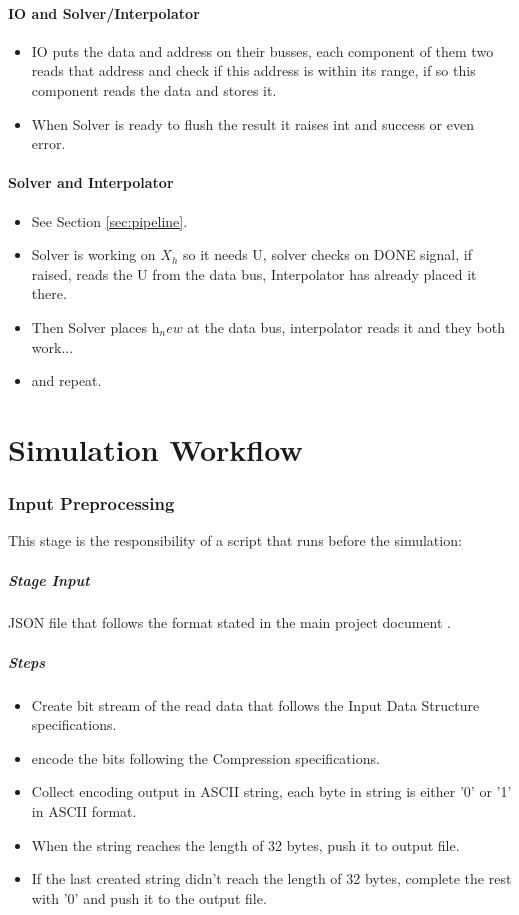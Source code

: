 \documentclass[12pt]{report}
\begin{document}
\subsection{IO and Solver/Interpolator}
\begin{itemize}
    \item IO puts the data and address on their busses, each component of them two reads that address and check if this address is within its range, if so this component reads the data and stores it.
    \item When Solver is ready to flush the result it raises int and success or even error.
\end{itemize}

\subsection{Solver and Interpolator}
\begin{itemize}
    \item See Section \ref{sec:pipeline}.
    \item Solver is working on $X_h$ so it needs U, solver checks on DONE signal, if raised, reads the U from the data bus, Interpolator has already placed it there.
    \item Then Solver places h$_new$ at the data bus, interpolator reads it and they both work...
    \item and repeat.
\end{itemize}

\part{Simulation Workflow}
\section{Input Preprocessing}
This stage is the responsibility of a script that runs before the simulation:
\subsubsection{Stage Input}
JSON file that follows the format stated in the main project document \cite{mainDoc}.

\subsubsection{Steps}
\begin{itemize}
    \item Create bit stream of the read data that follows the {Input Data Structure} specifications.
    \item encode the bits following the {Compression} specifications.
    \item Collect encoding output in ASCII string, each byte in string is either '0' or '1' in ASCII format.
    \item When the string reaches the length of 32 bytes, push it to output file.
    \item If the last created string didn't reach the length of 32 bytes, complete the rest with '0' and push it to the output file.    
\end{itemize}
\end{document}

